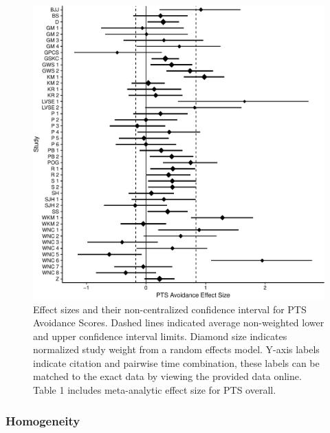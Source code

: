 \documentclass[man]{apa6}
\theoremstyle{definition}
\theoremstyle{definition}
\theoremstyle{definition}
\theoremstyle{remark}
\begin{document}
\begin{figure}[htbp]
\centering
\includegraphics{meta_markdown_files/figure-latex/ptspicavoid-1.pdf}
\caption{\label{fig:ptspicavoid}Effect sizes and their non-centralized
confidence interval for PTS Avoidance Scores. Dashed lines indicated
average non-weighted lower and upper confidence interval limits. Diamond
size indicates normalized study weight from a random effects model.
Y-axis labels indicate citation and pairwise time combination, these
labels can be matched to the exact data by viewing the provided data
online. Table 1 includes meta-analytic effect size for PTS overall.}
\end{figure}

\subsubsection{Homogeneity}\label{homogeneity}
\end{document}
